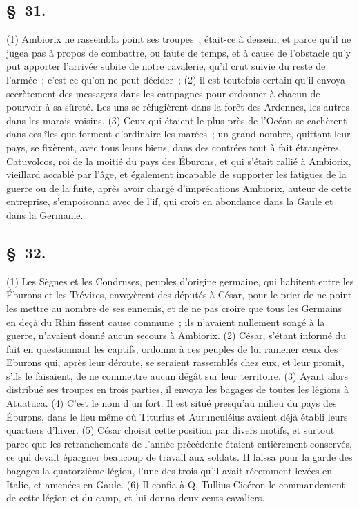 \documentclass[french,twoside]{book} %
\begin{document}
\subsection[{§ 31.}]{ \textsc{§ 31.} }
\noindent (1) Ambiorix ne rassembla point ses troupes ; était-ce à dessein, et parce qu’il ne jugea pas à propos de combattre, ou faute de temps, et à cause de l’obstacle qu’y put apporter l’arrivée subite de notre cavalerie, qu’il crut suivie du reste de l’armée ; c’est ce qu’on ne peut décider ; (2) il est toutefois certain qu’il envoya secrètement des messagers dans les campagnes pour ordonner à chacun de pourvoir à sa sûreté. Les uns se réfugièrent dans la forêt des Ardennes, les autres dans les marais voisins. (3) Ceux qui étaient le plus près de l’Océan se cachèrent dans ces îles que forment d’ordinaire les marées ; un grand nombre, quittant leur pays, se fixèrent, avec tous leurs biens, dans des contrées tout à fait étrangères. Catuvolcos, roi de la moitié du pays des Éburons, et qui s’était rallié à Ambiorix, vieillard accablé par l’âge, et également incapable de supporter les fatigues de la guerre ou de la fuite, après avoir chargé d’imprécations Ambiorix, auteur de cette entreprise, s’empoisonna avec de l’if, qui croit en abondance dans la Gaule et dans la Germanie.
\subsection[{§ 32.}]{ \textsc{§ 32.} }
\noindent (1) Les Sègnes et les Condruses, peuples d’origine germaine, qui habitent entre les Éburons et les Trévires, envoyèrent des députés à César, pour le prier de ne point les mettre au nombre de ses ennemis, et de ne pas croire que tous les Germains en deçà du Rhin fissent cause commune ; ils n’avaient nullement songé à la guerre, n’avaient donné aucun secours à Ambiorix. (2) César, s’étant informé du fait en questionnant les captifs, ordonna à ces peuples de lui ramener ceux des Eburons qui, après leur déroute, se seraient rassemblés chez eux, et leur promit, s’ils le faisaient, de ne commettre aucun dégât sur leur territoire. (3) Ayant alors distribué ses troupes en trois parties, il envoya les bagages de toutes les légions à Atuatuca. (4) C'est le nom d’un fort. Il est situé presqu’au milieu du pays des Éburons, dans le lieu même où Titurius et Aurunculéius avaient déjà établi leurs quartiers d’hiver. (5) César choisit cette position par divers motifs, et surtout parce que les retranchements de l’année précédente étaient entièrement conservés, ce qui devait épargner beaucoup de travail aux soldats. II laissa pour la garde des bagages la quatorzième légion, l’une des trois qu’il avait récemment levées en Italie, et amenées en Gaule. (6) Il confia à Q. Tullius Cicéron le commandement de cette légion et du camp, et lui donna deux cents cavaliers.
\end{document}
